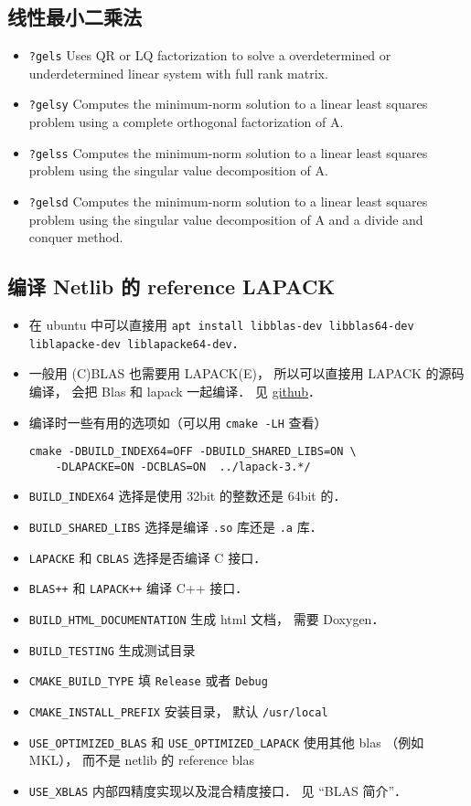 \subsection{线性最小二乘法}
\begin{itemize}
\item \verb|?gels| Uses QR or LQ factorization to solve a overdetermined or underdetermined linear system with full rank matrix.
\item \verb|?gelsy| Computes the minimum-norm solution to a linear least squares problem using a complete orthogonal factorization of A.
\item \verb|?gelss| Computes the minimum-norm solution to a linear least squares problem using the singular value decomposition of A.
\item \verb|?gelsd| Computes the minimum-norm solution to a linear least squares problem using the singular value decomposition of A and a divide and conquer method.
\end{itemize}

\subsection{编译 Netlib 的 reference LAPACK}
\begin{itemize}
\item 在 ubuntu 中可以直接用 \verb|apt install libblas-dev libblas64-dev liblapacke-dev liblapacke64-dev|．
\item 一般用 (C)BLAS 也需要用 LAPACK(E)， 所以可以直接用 LAPACK 的源码编译， 会把 Blas 和 lapack 一起编译． 见 \href{https://github.com/Reference-LAPACK/lapack/}{github}．
\item 编译时一些有用的选项如（可以用 \verb|cmake -LH| 查看）
\begin{lstlisting}[language=none]
cmake -DBUILD_INDEX64=OFF -DBUILD_SHARED_LIBS=ON \
    -DLAPACKE=ON -DCBLAS=ON  ../lapack-3.*/
\end{lstlisting}
\item \verb|BUILD_INDEX64| 选择是使用 32bit 的整数还是 64bit 的．
\item \verb|BUILD_SHARED_LIBS| 选择是编译 \verb|.so| 库还是 \verb|.a| 库．
\item \verb|LAPACKE| 和 \verb|CBLAS| 选择是否编译 C 接口．
\item \verb|BLAS++| 和 \verb|LAPACK++| 编译 C++ 接口．
\item \verb|BUILD_HTML_DOCUMENTATION| 生成 html 文档， 需要 Doxygen．
\item \verb|BUILD_TESTING| 生成测试目录
\item \verb|CMAKE_BUILD_TYPE| 填 \verb|Release| 或者 \verb|Debug|
\item \verb|CMAKE_INSTALL_PREFIX| 安装目录， 默认 \verb|/usr/local|
\item \verb|USE_OPTIMIZED_BLAS| 和 \verb|USE_OPTIMIZED_LAPACK| 使用其他 blas （例如 MKL）， 而不是 netlib 的 reference blas
\item \verb|USE_XBLAS| 内部四精度实现以及混合精度接口． 见 “BLAS 简介\upref{BLAS}”．
\end{itemize}

